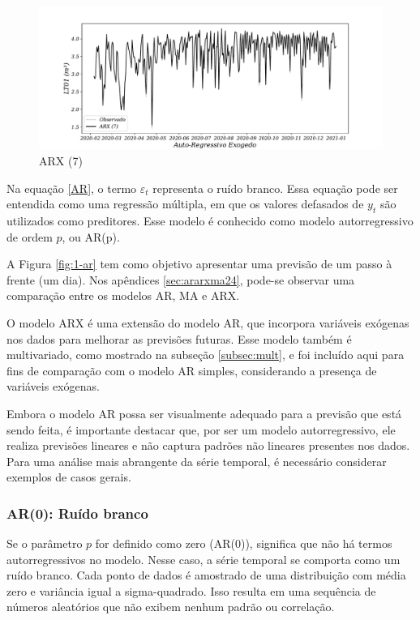 \begin{figure}[H]
	\centering
	\caption{ARX (7)}
	\label{fig:1-arx}
	\includegraphics[width=0.9\linewidth]{Modelos/Figuras/0-ARX}
	
\end{figure}



Na equação \eqref{AR}, o termo $\varepsilon_t$ representa o ruído branco. Essa equação pode ser entendida como uma regressão múltipla, em que os valores defasados de $y_t$ são utilizados como preditores. Esse modelo é conhecido como modelo autorregressivo de ordem $p$, ou AR(p).

A Figura \ref{fig:1-ar} tem como objetivo apresentar uma previsão de um passo à frente (um dia). Nos apêndices \ref{sec:ararxma24}, pode-se observar uma comparação entre os modelos AR, MA e ARX.

O modelo ARX é uma extensão do modelo AR, que incorpora variáveis exógenas nos dados para melhorar as previsões futuras. Esse modelo também é multivariado, como mostrado na subseção \ref{subsec:mult}, e foi incluído aqui para fins de comparação com o modelo AR simples, considerando a presença de variáveis exógenas.

Embora o modelo AR possa ser visualmente adequado para a previsão que está sendo feita, é importante destacar que, por ser um modelo autorregressivo, ele realiza previsões lineares e não captura padrões não lineares presentes nos dados. Para uma análise mais abrangente da série temporal, é necessário considerar exemplos de casos gerais.

\subsubsection{AR(0): Ru\'ido branco}

Se o parâmetro $p$ for definido como zero (AR($0$)), significa que não há termos autorregressivos no modelo. Nesse caso, a série temporal se comporta como um ruído branco. Cada ponto de dados é amostrado de uma distribuição com média zero e variância igual a sigma-quadrado. Isso resulta em uma sequência de números aleatórios que não exibem nenhum padrão ou correlação.


